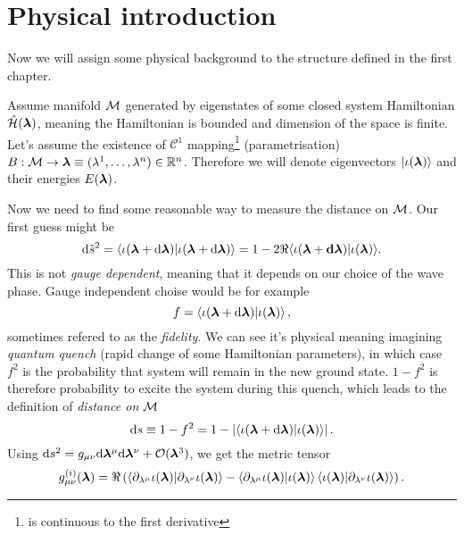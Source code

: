 \chapter{Physical introduction}
Now we will assign some physical background to the structure defined in the first chapter.

Assume manifold $\mathcal{M}$ generated by eigenstates of some closed system Hamiltonian $\hat{\mathcal{H}}(\bm\lambda)$, meaning the Hamiltonian is bounded and dimension of the space is finite. Let's assume the existence of $\mathcal{C}^1$ mapping\footnote{is continuous to the first derivative} (parametrisation) $B: \mathcal{M}\rightarrow \bm{\bm\lambda}\equiv (\lambda^1,\dots,\lambda^n)\in\mathbb{R}^n$. Therefore we will denote eigenvectors $\ket{\iota(\bm{\bm\lambda})}$ and their energies $E(\bm{\bm\lambda})$.

Now we need to find some reasonable way to measure the distance on $\mathcal{M}$. Our first guess might be
\begin{equation}
    \mathrm{d} \tilde{s}^2 = \braket{\iota(\bm{\bm\lambda}+\mathrm{d}\bm{\bm\lambda})|\iota(\bm{\bm\lambda}+\mathrm{d}\bm{\bm\lambda})} = 1-2\Re{\braket{\iota(\bm{\bm\lambda}+\bm{\ensuremath{\mathrm{d}}}\bm\lambda)|\iota(\bm{\bm\lambda})}}.
\end{equation}
This is not \emph{gauge dependent}, meaning that it depends on our choice of the wave phase. Gauge independent choise would be for example 
\begin{equation}
    f=\braket{\iota(\bm{\bm\lambda}+\mathrm{d}\bm{\bm\lambda})|\iota(\bm{\bm\lambda})},
\end{equation}
sometimes refered to as the \emph{fidelity}. We can see it's physical meaning imagining \emph{quantum quench} (rapid change of some Hamiltonian parameters), in which case $f^2$ is the probability that system will remain in the new ground state. $1-f^2$ is therefore probability to excite the system during this quench, which leads to the definition of \emph{distance on $\mathcal{M}$}
\begin{equation}
    \mathrm{d} s \equiv 1-f^2= 1-\left|\braket{\iota(\bm{\bm\lambda}+\mathrm{d}\bm{\bm\lambda})|\iota(\bm{\bm\lambda})}\right|.
\end{equation}
Using $\mathrm{d} s^2 = g_{\mu\nu}\mathrm{d} \bm\lambda^\mu \mathrm{d}\bm\lambda^\nu+\mathcal{O}(\bm\lambda^3)$, we get the metric tensor
\begin{equation}
    g_{\mu\nu}^{(i)}(\bm{\bm\lambda}) = \Re\left(\braket{\partial_{\lambda^\mu}\iota(\bm{\bm\lambda})|\partial_{\lambda^\nu}\iota(\bm{\bm\lambda})} - \braket{\partial_{\lambda^\mu}\iota(\bm{\bm\lambda})|\iota(\bm{\bm\lambda})}\braket{\iota(\bm{\bm\lambda})|\partial_{\lambda^\nu}\iota(\bm{\bm\lambda})}\right).
    \label{eq:geom.tensorDefinition}
\end{equation}

